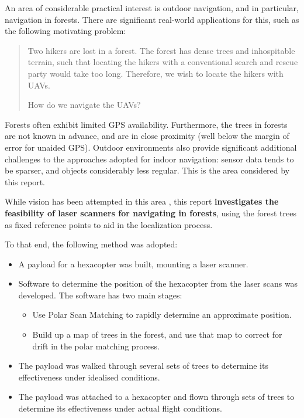 \documentclass[12pt,oneside,a4paper,draft]{book}
\begin{document}
An area of considerable practical interest is outdoor navigation, and
in particular, navigation in forests.  There are significant real-world
applications for this, such as the following motivating problem:
\begin{quote}
  Two hikers are lost in a forest. The forest has dense trees and
  inhospitable terrain, such that locating the hikers with a
  conventional search and rescue party would take too long. Therefore,
  we wish to locate the hikers with UAVs.

  How do we navigate the UAVs?
\end{quote}

Forests often exhibit limited GPS availability. Furthermore,
the trees in forests are not known in advance, and are in close
proximity (well below the margin of error for unaided GPS). Outdoor
environments also provide significant additional challenges to the
approaches adopted for indoor navigation: sensor data tends to be
sparser, and objects considerably less regular. This is the area
considered by this report.

While vision has been attempted in this area
\cite{langelaan2005towards}, this report \textbf{investigates the
  feasibility of laser scanners for navigating in forests}, using the
forest trees as fixed reference points to aid in the localization
process.


To that end, the following method was adopted:
\begin{itemize}
\item A payload for a hexacopter was built, mounting a laser scanner.
\item Software to determine the position of the hexacopter from the
  laser scans was developed. The software has two main stages:
  \begin{itemize}
  \item Use Polar Scan Matching to rapidly determine an approximate
    position.
  \item Build up a map of trees in the forest, and use that map to
    correct for drift in the polar matching process.
  \end{itemize}
\item The payload was walked through several sets of trees to determine
  its effectiveness under idealised conditions.
\item The payload was attached to a hexacopter and flown through sets
  of trees to determine its effectiveness under actual flight conditions.
\end{itemize}
\end{document}
